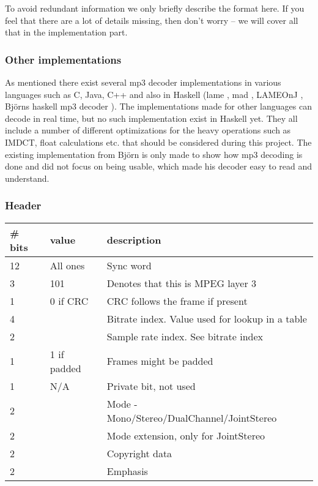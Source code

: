 \documentclass[a4paper,12pt]{article}
\begin{document}
       To avoid redundant information we only briefly describe the format here.
       If you feel that there are a lot of details missing, then don't worry --
       we will cover all that in the implementation part.

       \subsubsection{Other implementations}
           As mentioned there exist several mp3 decoder
           implementations in various languages such as C, Java, C++
           and also in Haskell (lame \cite{lame}, mad \cite{mad},
           LAMEOnJ \cite{lameonj}, Björns haskell mp3
           decoder \cite{bjorn}). The implementations made for other languages can
           decode in real time, but no such implementation exist in
           Haskell yet. They all include a number of different
           optimizations for the heavy operations such as IMDCT,
           float calculations etc. that should be considered during
           this project. The existing implementation from Björn is
           only made to show how mp3 decoding is done and did not
           focus on being usable, which made his decoder easy to read
           and understand.

       \subsubsection{Header}
       \label{sec:header}
        \begin{tabular}{l l l}
            \# bits & value & description \\ \hline
            12  & All ones    & Sync word \\
            3   & 101         & Denotes that this is MPEG layer 3 \\
            1   & 0 if CRC    & CRC follows the frame if present \\
            4   &             & Bitrate index. Value used for lookup in a table \\
            2   &             & Sample rate index. See bitrate index \\
            1   & 1 if padded & Frames might be padded \\
            1   & N/A         & Private bit, not used \\
            2   &             & Mode - Mono/Stereo/DualChannel/JointStereo \\
            2   &             & Mode extension, only for JointStereo \\
            2   &             & Copyright data \\
            2   &             & Emphasis
        \end{tabular} \\
\end{document}
